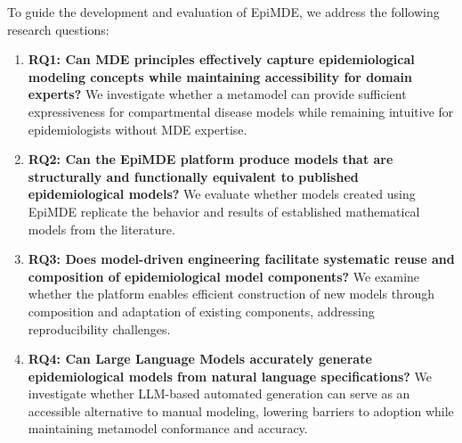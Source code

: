 To guide the development and evaluation of EpiMDE, we address the following research questions:

\begin{enumerate}
    \item \textbf{RQ1: Can MDE principles effectively capture epidemiological modeling concepts while maintaining accessibility for domain experts?} We investigate whether a metamodel can provide sufficient expressiveness for compartmental disease models while remaining intuitive for epidemiologists without MDE expertise.

    \item \textbf{RQ2: Can the EpiMDE platform produce models that are structurally and functionally equivalent to published epidemiological models?} We evaluate whether models created using EpiMDE replicate the behavior and results of established mathematical models from the literature.

    \item \textbf{RQ3: Does model-driven engineering facilitate systematic reuse and composition of epidemiological model components?} We examine whether the platform enables efficient construction of new models through composition and adaptation of existing components, addressing reproducibility challenges.

    \item \textbf{RQ4: Can Large Language Models accurately generate epidemiological models from natural language specifications?} We investigate whether LLM-based automated generation can serve as an accessible alternative to manual modeling, lowering barriers to adoption while maintaining metamodel conformance and accuracy.
\end{enumerate}

